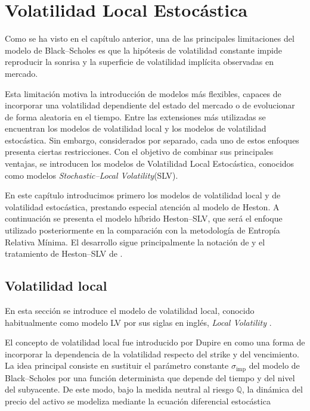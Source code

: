 \chapter{Volatilidad Local Estocástica}
Como se ha visto en el capítulo anterior, una de las principales limitaciones del modelo de Black--Scholes es que la hipótesis de volatilidad constante impide reproducir la sonrisa y la superficie de volatilidad implícita observadas en mercado.\medskip 

Esta limitación motiva la introducción de modelos más flexibles, capaces de incorporar una volatilidad dependiente del estado del mercado o de evolucionar de forma aleatoria en el tiempo. Entre las extensiones más utilizadas se encuentran los modelos de volatilidad local y los modelos de volatilidad estocástica. Sin embargo, considerados por separado, cada uno de estos enfoques presenta ciertas restricciones. Con el objetivo de combinar sus principales ventajas, se introducen los modelos de Volatilidad Local Estocástica, conocidos como modelos \textit{Stochastic--Local Volatility}(SLV).\medskip

En este capítulo introducimos primero los modelos de volatilidad local y de volatilidad estocástica, prestando especial atención al modelo de Heston. A continuación se presenta el modelo híbrido Heston--SLV, que será el enfoque utilizado posteriormente en la comparación con la metodología de Entropía Relativa Mínima. El desarrollo sigue principalmente la notación de \cite{DanielArrietaPresentation} y el tratamiento de Heston--SLV de \cite{oosterlee2021modelos}.

\section{Volatilidad local}

En esta sección se introduce el modelo de volatilidad local, conocido habitualmente como modelo LV por sus siglas en inglés, \textit{Local Volatility }. \medskip

El concepto de volatilidad local fue introducido por Dupire en \cite{Dupire1994} como una forma de incorporar la dependencia de la volatilidad respecto del strike y del vencimiento. La idea principal consiste en sustituir el parámetro constante $\sigma_{\text{imp}}$ del modelo de Black--Scholes por una función determinista que depende del tiempo y del nivel del subyacente. De este modo, bajo la medida neutral al riesgo $\mathbb{Q}$, la dinámica del precio del activo se modeliza mediante la ecuación diferencial estocástica

